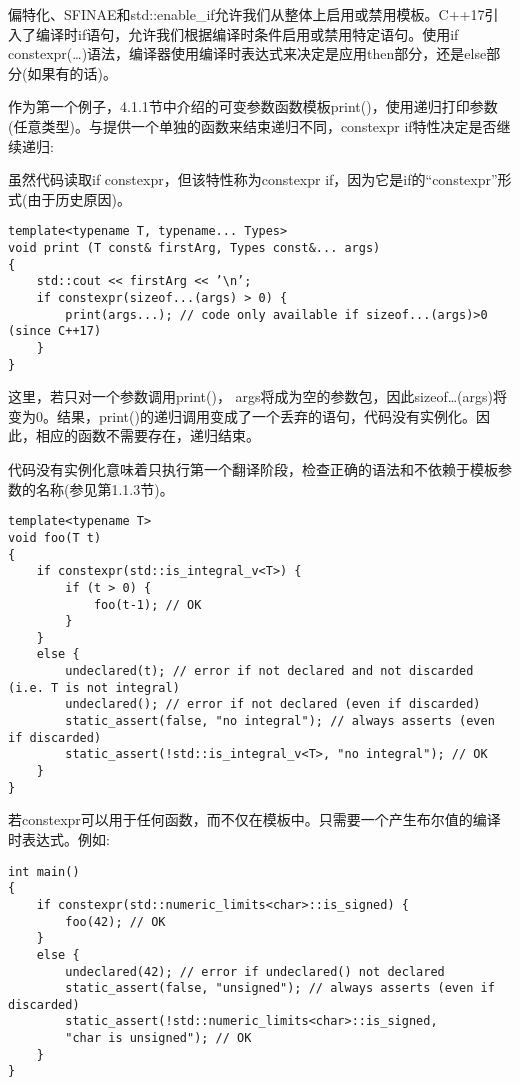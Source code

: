 偏特化、SFINAE和std::enable\_if允许我们从整体上启用或禁用模板。C++17引入了编译时if语句，允许我们根据编译时条件启用或禁用特定语句。使用if constexpr(…)语法，编译器使用编译时表达式来决定是应用then部分，还是else部分(如果有的话)。

作为第一个例子，4.1.1节中介绍的可变参数函数模板print()，使用递归打印参数(任意类型)。与提供一个单独的函数来结束递归不同，constexpr if特性决定是否继续递归:

\begin{tcolorbox}[colback=webgreen!5!white,colframe=webgreen!75!black]
\hspace*{0.75cm}虽然代码读取if constexpr，但该特性称为constexpr if，因为它是if的“constexpr”形式(由于历史原因)。
\end{tcolorbox}

\begin{lstlisting}[style=styleCXX]
template<typename T, typename... Types>
void print (T const& firstArg, Types const&... args)
{
	std::cout << firstArg << ’\n’;
	if constexpr(sizeof...(args) > 0) {
		print(args...); // code only available if sizeof...(args)>0 (since C++17)
	}
}
\end{lstlisting}

这里，若只对一个参数调用print()， args将成为空的参数包，因此sizeof…(args)将变为0。结果，print()的递归调用变成了一个丢弃的语句，代码没有实例化。因此，相应的函数不需要存在，递归结束。

代码没有实例化意味着只执行第一个翻译阶段，检查正确的语法和不依赖于模板参数的名称(参见第1.1.3节)。

\begin{lstlisting}[style=styleCXX]
template<typename T>
void foo(T t)
{
	if constexpr(std::is_integral_v<T>) {
		if (t > 0) {
			foo(t-1); // OK
		}
	}
	else {
		undeclared(t); // error if not declared and not discarded (i.e. T is not integral)
		undeclared(); // error if not declared (even if discarded)
		static_assert(false, "no integral"); // always asserts (even if discarded)
		static_assert(!std::is_integral_v<T>, "no integral"); // OK
	}
}
\end{lstlisting}

若constexpr可以用于任何函数，而不仅在模板中。只需要一个产生布尔值的编译时表达式。例如:

\begin{lstlisting}[style=styleCXX]
int main()
{
	if constexpr(std::numeric_limits<char>::is_signed) {
		foo(42); // OK
	}
	else {
		undeclared(42); // error if undeclared() not declared
		static_assert(false, "unsigned"); // always asserts (even if discarded)
		static_assert(!std::numeric_limits<char>::is_signed,
		"char is unsigned"); // OK
	}
}
\end{lstlisting}

